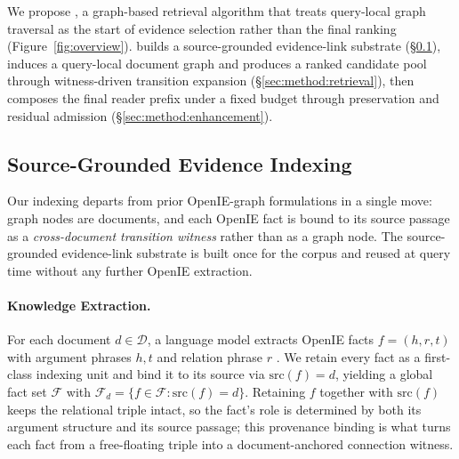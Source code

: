 We propose \methodname{}, a graph-based retrieval algorithm that
treats query-local graph traversal as the start of evidence selection rather
than the final ranking (Figure~\ref{fig:overview}). \methodname{}
builds a source-grounded evidence-link substrate
(\S\ref{sec:method:substrate}), induces a
query-local document graph and produces a ranked candidate pool
through witness-driven transition expansion
(\S\ref{sec:method:retrieval}), then composes the final reader
prefix under a fixed budget through preservation and residual
admission (\S\ref{sec:method:enhancement}).

\subsection{Source-Grounded Evidence Indexing}
\label{sec:method:substrate}

Our indexing departs from prior OpenIE-graph formulations
\citep{jimenez2024hipporag,gutierrez2025hipporag,wang2025proprag}
in a single move: graph nodes are documents, and each OpenIE fact
is bound to its source passage as a
\emph{cross-document transition witness} rather than as a graph node.
The source-grounded evidence-link substrate is built once for the corpus and reused at query
time without any further OpenIE extraction.

\paragraph{Knowledge Extraction.}
For each document $d \in \mathcal{D}$, a language model extracts
OpenIE facts $f=(h,r,t)$ with argument phrases $h, t$ and relation
phrase $r$
\citep{angeli2015leveraging,gutierrez2025hipporag}. We retain every
fact as a first-class indexing unit and bind it to its source via
$\mathrm{src}(f)=d$, yielding a global fact set $\mathcal{F}$ with
$\mathcal{F}_d = \{f\in\mathcal{F} : \mathrm{src}(f)=d\}$. Retaining
$f$ together with $\mathrm{src}(f)$ keeps the relational triple
intact, so the fact's role is determined by both its argument
structure and its source passage; this provenance binding is what
turns each fact from a free-floating triple into a
document-anchored connection witness.

